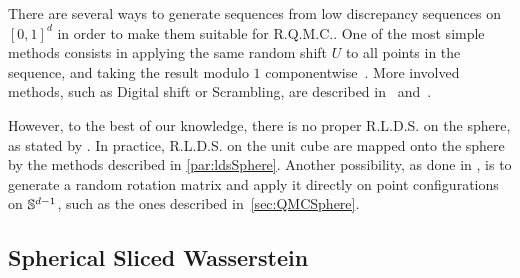 \noindent 
There are several  ways to generate sequences from low discrepancy sequences on 
$[0,1]^d$ in order to make them suitable for R.Q.M.C.. One of the most simple 
methods consists in applying the same random shift $U$ to all points in the 
sequence, and taking the result modulo $1$ 
componentwise~\citep{lemieux2009monte}. More involved methods, such as Digital 
shift or Scrambling, are described in~\citep{lemieux2009monte} 
and~\citep{owen2019monte}.  

However, to the best of our knowledge, there is no proper R.L.D.S. on the sphere, as stated by \citet{nguyen2024quasimonte}. 
In practice,  R.L.D.S. on the unit cube are mapped onto the sphere by the methods described in \autoref{par:ldsSphere}. Another possibility, as done in \citet{nguyen2024quasimonte}, is to generate a random rotation matrix and apply it directly on point configurations on $\mathbb{S}^{d-1}$, {such as the ones described in~\autoref{sec:QMCSphere}}.

{
\subsection{Spherical Sliced Wasserstein}}

